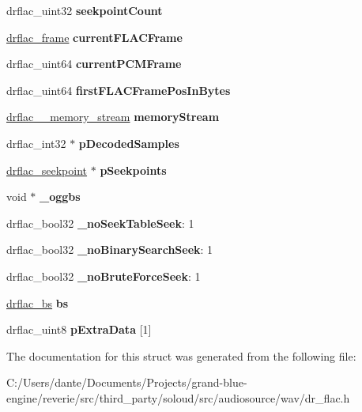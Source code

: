 \begin{DoxyCompactItemize}
\mbox{\label{structdrflac_a4e58913b777387919567bff6ead5b7a1}} 
drflac\+\_\+uint32 {\bfseries seekpoint\+Count}
\item 
\mbox{\label{structdrflac_aa9d3ef0dd6ec40ad5bfd10b2f02407cd}} 
\mbox{\hyperlink{structdrflac__frame}{drflac\+\_\+frame}} {\bfseries current\+F\+L\+A\+C\+Frame}
\item 
\mbox{\label{structdrflac_ae76cb52fae538931af9208f17a48433c}} 
drflac\+\_\+uint64 {\bfseries current\+P\+C\+M\+Frame}
\item 
\mbox{\label{structdrflac_adebf383439b4b4b6296e92a560e68c50}} 
drflac\+\_\+uint64 {\bfseries first\+F\+L\+A\+C\+Frame\+Pos\+In\+Bytes}
\item 
\mbox{\label{structdrflac_ab68b04e306280680cf0dc6af98362253}} 
\mbox{\hyperlink{structdrflac____memory__stream}{drflac\+\_\+\+\_\+memory\+\_\+stream}} {\bfseries memory\+Stream}
\item 
\mbox{\label{structdrflac_a253f4a5bc2c27f6758ff123279cb50dd}} 
drflac\+\_\+int32 $\ast$ {\bfseries p\+Decoded\+Samples}
\item 
\mbox{\label{structdrflac_a8109736bd2c564bec34fdfc578c91c4b}} 
\mbox{\hyperlink{structdrflac__seekpoint}{drflac\+\_\+seekpoint}} $\ast$ {\bfseries p\+Seekpoints}
\item 
\mbox{\label{structdrflac_a4d053bc5c3d5997fb5aa57ed486be33e}} 
void $\ast$ {\bfseries \+\_\+oggbs}
\item 
\mbox{\label{structdrflac_afbf95f837cda1547e31648956c465788}} 
drflac\+\_\+bool32 {\bfseries \+\_\+no\+Seek\+Table\+Seek}\+: 1
\item 
\mbox{\label{structdrflac_a6621f51540790fb1028990e58d67b5da}} 
drflac\+\_\+bool32 {\bfseries \+\_\+no\+Binary\+Search\+Seek}\+: 1
\item 
\mbox{\label{structdrflac_a7c1e4d821f00a44f958c57ec1825b6da}} 
drflac\+\_\+bool32 {\bfseries \+\_\+no\+Brute\+Force\+Seek}\+: 1
\item 
\mbox{\label{structdrflac_a6cbafadfdec413ab75efe2fbb157eee8}} 
\mbox{\hyperlink{structdrflac__bs}{drflac\+\_\+bs}} {\bfseries bs}
\item 
\mbox{\label{structdrflac_a1892c39a1c4e6372f1ff627725b5208b}} 
drflac\+\_\+uint8 {\bfseries p\+Extra\+Data} \mbox{[}1\mbox{]}
\end{DoxyCompactItemize}


The documentation for this struct was generated from the following file\+:\begin{DoxyCompactItemize}
\item 
C\+:/\+Users/dante/\+Documents/\+Projects/grand-\/blue-\/engine/reverie/src/third\+\_\+party/soloud/src/audiosource/wav/dr\+\_\+flac.\+h\end{DoxyCompactItemize}

